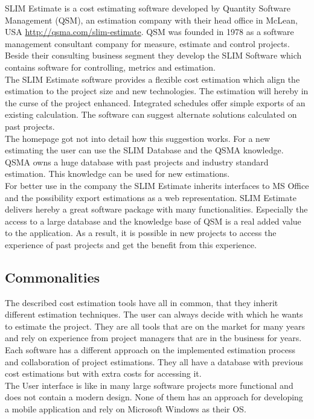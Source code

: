SLIM Estimate is a cost estimating software developed by Quantity Software Management (QSM), an estimation company with their head office in McLean, USA \url{http://qsma.com/slim-estimate}. QSM was founded in 1978 as a software management consultant company for measure, estimate and control projects. Beside their consulting business segment they develop the SLIM Software which contains software for controlling, metrics and estimation.
\\
The SLIM Estimate software provides a flexible cost estimation which align the estimation to the project size and new technologies. The estimation will hereby in the curse of the project enhanced. Integrated schedules offer simple exports of an existing calculation. The software can suggest alternate solutions calculated on past projects.
\\
The homepage got not into detail how this suggestion works. For a new estimating the user can use the SLIM Database and the QSMA knowledge. QSMA owns a huge database with past projects and industry standard estimation. This knowledge can be used for new estimations.
\\
For better use in the company the SLIM Estimate inherits interfaces to MS Office and the possibility export estimations as a web representation. SLIM Estimate delivers hereby a great software package with many functionalities. Especially the access to a large database and the knowledge base of QSM is a real added value to the application. As a result, it is possible in new projects to access the experience of past projects and get the benefit from this experience.


\subsection{Commonalities}

The described cost estimation tools have all in common, that they inherit different estimation techniques. The user can always decide with which he wants to estimate the project. They are all tools that are on the market for many years and rely on experience from project managers that are in the business for years. Each software has a different approach on the implemented estimation process and collaboration of project estimations. They all have a database with previous cost estimations but with extra costs for accessing it.\\
The User interface is like in many large software projects more functional and does not contain a modern design. None of them has an approach for developing a mobile application and rely on Microsoft Windows as their OS.

